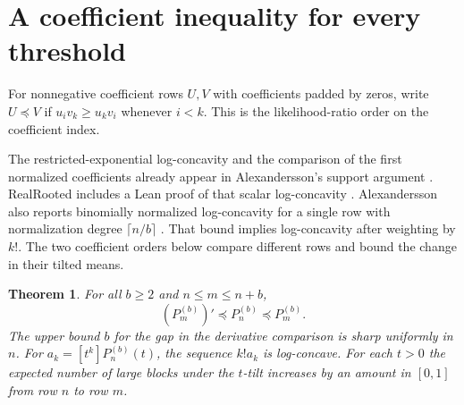 \documentclass[11pt]{article}
\newtheorem{theorem}{Theorem}
\begin{document}
\section{A coefficient inequality for every threshold}\label{sec:coefficients}
For nonnegative coefficient rows \(U,V\) with coefficients padded by zeros, write \(U\preceq V\) if \(u_i v_k\ge u_k v_i\) whenever \(i<k\). This is the likelihood-ratio order on the coefficient index.

The restricted-exponential log-concavity and the comparison of the first normalized coefficients already appear in Alexandersson's support argument \cite{rrsupport}. RealRooted includes a Lean proof of that scalar log-concavity \cite{rrrestricted}. Alexandersson also reports binomially normalized log-concavity for a single row with normalization degree \(\lceil n/b\rceil\) \cite{rrlorentz}. That bound implies log-concavity after weighting by \(k!\). The two coefficient orders below compare different rows and bound the change in their tilted means.

\begin{theorem}\label{thm:coefficients}
For all \(b\ge2\) and \(n\le m\le n+b\),
\[
 (P^{(b)}_m)'\preceq P^{(b)}_n\preceq P^{(b)}_m .
\]
The upper bound \(b\) for the gap in the derivative comparison is sharp uniformly in \(n\). For \(a_k=[t^k]P^{(b)}_n(t)\), the sequence \(k!a_k\) is log-concave. For each \(t>0\) the expected number of large blocks under the \(t\)-tilt increases by an amount in \([0,1]\) from row \(n\) to row \(m\).
\end{theorem}
\end{document}
